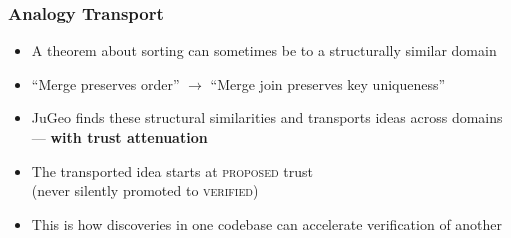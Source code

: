 \begin{frame}
\frametitle{Analogy Transport}
\begin{center}
\end{center}
\vfill
\begin{itemize}
  \item A theorem about sorting can sometimes be 
        to a structurally similar domain
  \item ``Merge preserves order'' $\longrightarrow$ ``Merge join preserves key uniqueness''
  \item JuGeo finds these structural similarities and transports ideas
        across domains --- \textbf{with trust attenuation}
  \item The transported idea starts at \textsc{proposed} trust\\
        (never silently promoted to \textsc{verified})
  \item This is how discoveries in one codebase can accelerate
        verification of another
\end{itemize}
\end{frame}

